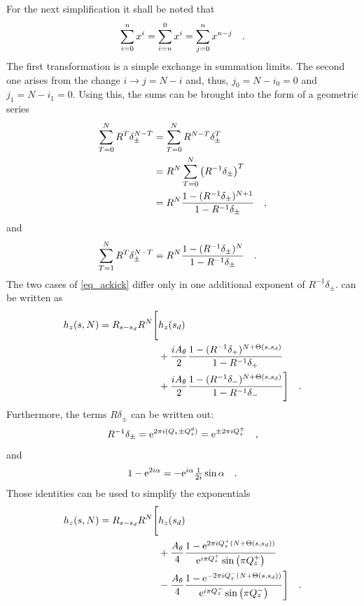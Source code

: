 %
For the next simplification it shall be noted that
%
\begin{equation}
    \sum\limits_{i=0}^n x^i = \sum\limits_{i=n}^0 x^i = \sum\limits_{j=0}^{n} x^{n-j}
    \quad .
\end{equation}
%
The first transformation is a simple exchange in summation limits. The second one arises from the
change $i\rightarrow j=N-i$ and, thus, $j_0 = N-i_0 = 0$ and $j_1 = N - i_1 = 0$.
Using this, the sums can be brought into the form of a geometric series
%
\begin{align}
    \sum\limits_{T=0}^N R^T\delta_\pm^{N-T}
    &= \sum\limits_{T=0}^N R^{N-T}\delta_\pm^{T} \notag \\
    &=  R ^N \sum\limits_{T=0}^N \left( R^{-1}\delta_\pm \right)^{T} \notag \\
    &=  R ^N \frac{1- (R^{-1}\delta_\pm)^{N+1}}{1 - R^{-1}\delta_\pm}
    \quad ,
\end{align}
%
and
%
\begin{align}
    \sum\limits_{T=1}^N R^T\delta_\pm^{N-T}
    &= R^N \frac{1- (R^{-1}\delta_\pm)^{N}}{1 - R^{-1}\delta_\pm}
    \quad .
\end{align}
%
The two cases of \eqref{eq_ackick} differ only in one additional exponent of $R^{-1}\delta_\pm$.
 can be written as
%
\begin{align}
    h_z(s, N) = R_{s-s_d}R^N 
    \Bigg[&h_z(s_d)  \notag \\
        &+ \frac{iA_\theta}{2}\frac{1-(R^{-1}\delta_+)^{N+\Theta(s,s_d)}}{1-R^{-1}\delta_+}  \notag \\
        &+ \frac{iA_\theta}{2}\frac{1-(R^{-1}\delta_-)^{N+\Theta(s,s_d)}}{1-R^{-1}\delta_-}
    \Bigg]
    \quad .
\end{align}
%
Furthermore, the terms $R\delta_\pm$ can be written out:
%
\begin{equation}
    R^{-1}\delta_\pm = \text{e}^{2\pi i (Q_z \pm Q^{d}_{z})} = \text{e}^{\pm 2\pi i Q_z^\pm}
    \quad ,
\end{equation}
%
and
%
\begin{equation}
    1 - \text{e}^{2i\alpha} = -\text{e}^{i\alpha}\tfrac{1}{2i} \sin\alpha
    \quad .
\end{equation}
%
Those identities can be used to simplify the exponentials
%
\begin{align}
    h_z(s, N) = R_{s-s_d}R^N 
    \Bigg[&h_z(s_d)  \notag \\
        &+ \frac{A_\theta}{4}\frac{1-\text{e}^{2\pi i Q_z^+(N+\Theta(s,s_d))}}{\text{e}^{i\pi Q_z^+}\sin\left( \pi Q_z^+ \right)}  \notag \\
        &- \frac{A_\theta}{4}\frac{1-\text{e}^{-2\pi i Q_z^-(N+\Theta(s,s_d))}}{\text{e}^{i\pi Q_z^-}\sin\left( \pi Q_z^- \right)}
    \Bigg]
    \quad .
    \label{eq_delta_written_out}
\end{align}
